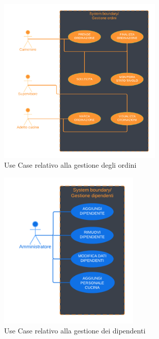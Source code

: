         \begin{figure}[H]
            \centering
            \includegraphics[width=0.7\textwidth]{assets/diagrammi/Use-Case/Gestione ordini.png}
            \caption{Use Case relativo alla gestione degli ordini}
            \label{fig:ucdOrderMgmt}
        \end{figure}
        
        \begin{figure}[H]
            \centering
            \includegraphics[width=0.6\textwidth]{assets/diagrammi/Use-Case/Gestione dipendenti.png}
            \caption{Use Case relativo alla gestione dei dipendenti}
            \label{fig:ucdWorkersMgmt}
        \end{figure}

